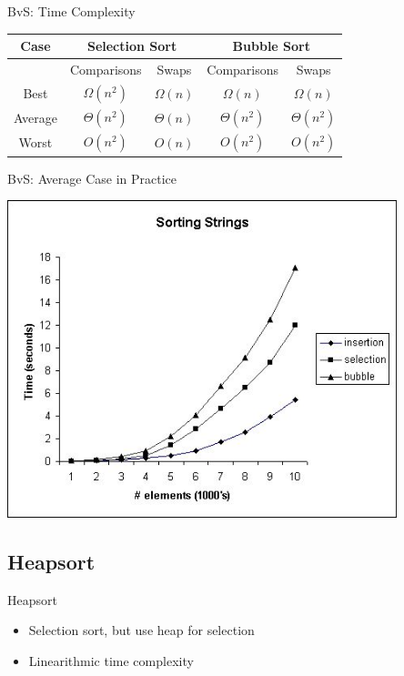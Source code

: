\documentclass[pdf]{beamer}
\begin{document}
\begin{frame}{BvS: Time Complexity}
  \begin{center}
    \begin{tabular}{c c c c c}
      \toprule
      Case & \multicolumn{2}{c}{Selection Sort}
           & \multicolumn{2}{c}{Bubble Sort}\\
      \midrule
      & Comparisons & Swaps & Comparisons & Swaps\\
      Best & $\Omega(n^2)$ & $\Omega(n)$ & $\Omega(n)$ & $\Omega(n)$\\
      Average & $\Theta(n^2)$ & $\Theta(n)$ & $\Theta(n^2)$ & $\Theta(n^2)$\\
      Worst & $O(n^2)$ & $O(n)$ & $O(n^2)$ & $O(n^2)$\\
      \bottomrule
    \end{tabular}
  \end{center}
\end{frame}

\begin{frame}{BvS: Average Case in Practice}
  \begin{center}
    \includegraphics[width=0.85\textwidth]{bubbleplot.jpg}
  \end{center}
\end{frame}

\subsection{Heapsort}
\begin{frame}{Heapsort}\Large
  \begin{itemize}
    \item Selection sort, but use heap for selection
    \item Linearithmic time complexity
  \end{itemize}
\end{frame}
\end{document}
